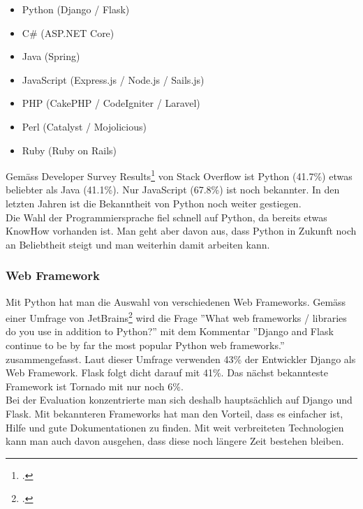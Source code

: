 
\begin{itemize}
	\item Python (Django / Flask)
	\item C\# (ASP.NET Core)
	\item Java (Spring)
	\item JavaScript (Express.js / Node.js / Sails.js)
	\item PHP (CakePHP / CodeIgniter / Laravel)
	\item Perl (Catalyst / Mojolicious)
	\item Ruby (Ruby on Rails)
\end{itemize}


Gemäss Developer Survey Results\footcite{developer_survey_results} von Stack Overflow ist Python (41.7\%) etwas beliebter als Java (41.1\%). Nur JavaScript (67.8\%) ist noch bekannter. In den letzten Jahren ist die Bekanntheit von Python noch weiter gestiegen. \\

Die Wahl der Programmiersprache fiel schnell auf Python, da bereits etwas KnowHow vorhanden ist. Man geht aber davon aus, dass Python in Zukunft noch an Beliebtheit steigt und man weiterhin damit arbeiten kann.

\newpage

\subsubsection*{Web Framework}
Mit Python hat man die Auswahl von verschiedenen Web Frameworks. Gemäss einer Umfrage von JetBrains\footcite{python_survey_results} wird die Frage ''What web frameworks / libraries do you use in addition to Python?'' mit dem Kommentar ''Django and Flask continue to be by far the most popular Python web frameworks.'' zusammengefasst. Laut dieser Umfrage verwenden 43\% der Entwickler  Django als Web Framework. Flask folgt dicht darauf mit 41\%. Das nächst bekannteste Framework ist Tornado mit nur noch 6\%. \\
Bei der Evaluation konzentrierte man sich deshalb hauptsächlich auf Django und Flask. Mit bekannteren Frameworks hat man den Vorteil, dass es einfacher ist, Hilfe und gute Dokumentationen zu finden. Mit weit verbreiteten Technologien kann man auch davon ausgehen, dass diese noch längere Zeit bestehen bleiben.  \\ 

